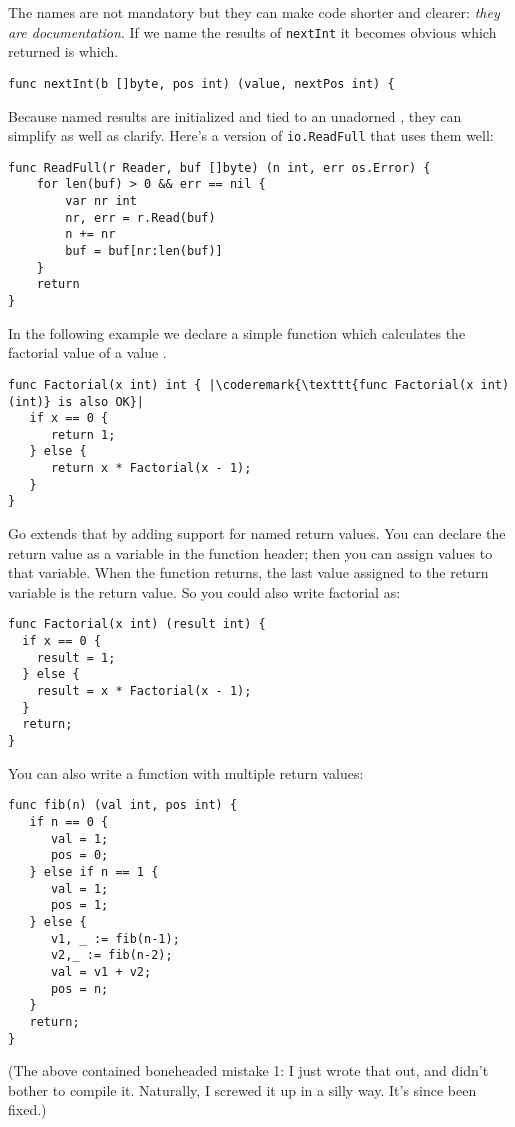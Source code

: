 The names are not mandatory but they can make code shorter and clearer:
\emph{they are documentation}. 
If we name the results of \lstinline{nextInt} it becomes obvious which
returned  is which.

\begin{lstlisting}
func nextInt(b []byte, pos int) (value, nextPos int) {
\end{lstlisting}
Because named results are initialized and tied to an unadorned
,
they can simplify as well as clarify. Here's a version of
\lstinline{io.ReadFull} that uses them well:

\begin{lstlisting}
func ReadFull(r Reader, buf []byte) (n int, err os.Error) {
    for len(buf) > 0 && err == nil {
        var nr int
        nr, err = r.Read(buf)
        n += nr
        buf = buf[nr:len(buf)]
    }
    return
}
\end{lstlisting}

In the following example we declare a simple function which calculates
the factorial value of a value .

\begin{lstlisting}
func Factorial(x int) int { |\coderemark{\texttt{func Factorial(x int) (int)} is also OK}|
   if x == 0 {
      return 1;	
   } else {
      return x * Factorial(x - 1);
   }
}
\end{lstlisting}

Go extends that by adding support for named return values. You can 
declare the return value as a variable in the function header; then you
can assign values to that variable. When the function returns, the last
value assigned to the return variable is the return value. So you could
also write factorial as:

\begin{lstlisting}
func Factorial(x int) (result int) {
  if x == 0 {
    result = 1;	
  } else {
    result = x * Factorial(x - 1);
  }
  return;
}
\end{lstlisting}
You can also write a function with multiple return values:

\begin{lstlisting}
func fib(n) (val int, pos int) {
   if n == 0 {
      val = 1;
      pos = 0;
   } else if n == 1 {
      val = 1;
      pos = 1;
   } else {
      v1, _ := fib(n-1);
      v2,_ := fib(n-2);
      val = v1 + v2;
      pos = n;
   }
   return;
}
\end{lstlisting}
(The above contained boneheaded mistake 1: I just wrote that out, and didn't bother to compile it. Naturally, I screwed it up in a silly way. It's since been fixed.)

